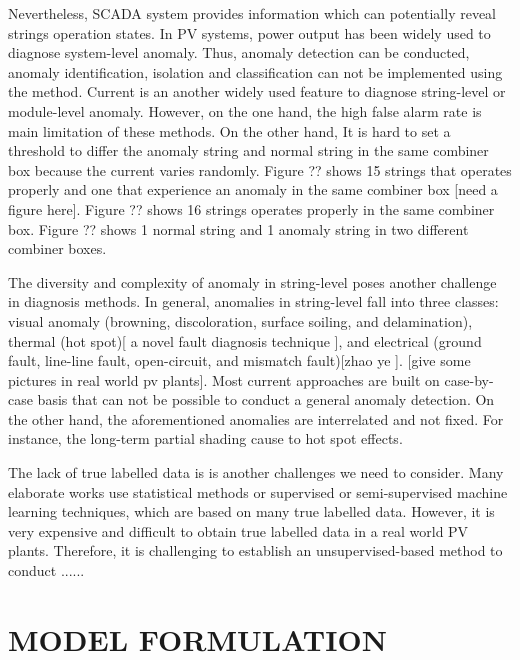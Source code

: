 \documentclass[journal]{IEEEtran}
\begin{document}
Nevertheless, SCADA system provides information which can potentially reveal strings operation states. In PV systems, power output has been widely used to diagnose system-level anomaly. Thus, anomaly detection can be conducted, anomaly identification, isolation and classification can not be implemented using the method. Current is an another widely used feature to diagnose string-level or module-level anomaly. However, on the one hand, the high false alarm rate is main limitation of these methods. On the other hand, It is hard to set a threshold to differ the anomaly string and normal string in the same combiner box because the current varies randomly. Figure ?? shows 15 strings that operates properly and one that experience an anomaly in the same combiner  box [need a figure here]. Figure ?? shows 16 strings operates properly in the same combiner box. Figure ?? shows 1 normal string and 1 anomaly string in two different combiner boxes. 

The diversity and complexity of anomaly in string-level poses another challenge in diagnosis methods. In general, anomalies in string-level fall into three classes: visual anomaly (browning, discoloration, surface soiling, and delamination), thermal (hot spot)[ a novel fault diagnosis technique ], and electrical (ground fault, line-line fault, open-circuit, and mismatch fault)[zhao ye ]. [give some pictures in real world pv plants]. Most current approaches are built on case-by-case basis that can not be possible to conduct a general anomaly detection. On the other hand, the aforementioned anomalies are interrelated and not fixed. For instance, the long-term partial shading cause to hot spot effects.

The lack of true labelled data is is another challenges we need to consider. Many elaborate works use statistical methods or supervised or semi-supervised machine learning techniques, which are based on many true labelled data. However, it is very expensive and difficult to obtain true labelled data in a real world PV plants. Therefore, it is challenging to establish an  unsupervised-based method to conduct ......

\section{MODEL FORMULATION}
\label{sctn:mdlfmlt}
\end{document}
